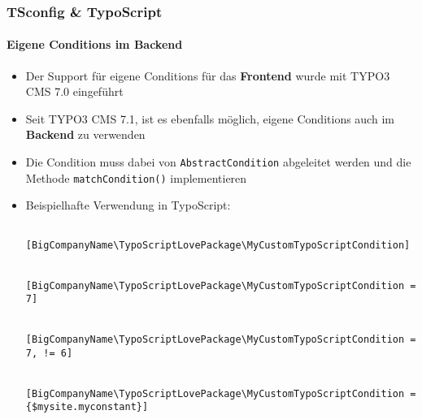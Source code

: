 
\begin{frame}[fragile]
	\frametitle{TSconfig \& TypoScript}
	\framesubtitle{Eigene Conditions im Backend}

	\lstset{basicstyle=\tiny\ttfamily}

	\begin{itemize}
	
		\item Der Support für eigene Conditions für das \textbf{Frontend} wurde mit TYPO3 CMS 7.0 eingeführt
		\item Seit TYPO3 CMS 7.1, ist es ebenfalls möglich, eigene Conditions auch im \textbf{Backend} zu verwenden
		\item Die Condition muss dabei von \texttt{AbstractCondition} abgeleitet werden und die Methode \texttt{matchCondition()} implementieren
		\item Beispielhafte Verwendung in TypoScript: 

			\begin{lstlisting}
				[BigCompanyName\TypoScriptLovePackage\MyCustomTypoScriptCondition]

				[BigCompanyName\TypoScriptLovePackage\MyCustomTypoScriptCondition = 7]

				[BigCompanyName\TypoScriptLovePackage\MyCustomTypoScriptCondition = 7, != 6]

				[BigCompanyName\TypoScriptLovePackage\MyCustomTypoScriptCondition = {$mysite.myconstant}]
			\end{lstlisting}

	\end{itemize}

\end{frame}



